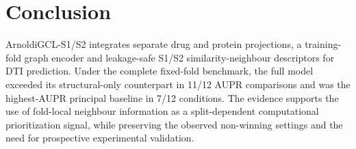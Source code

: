 \section{Conclusion}

ArnoldiGCL-S1/S2 integrates separate drug and protein projections, a training-fold graph encoder and leakage-safe S1/S2 similarity-neighbour descriptors for DTI prediction. Under the complete fixed-fold benchmark, the full model exceeded its structural-only counterpart in 11/12 AUPR comparisons and was the highest-AUPR principal baseline in 7/12 conditions. The evidence supports the use of fold-local neighbour information as a split-dependent computational prioritization signal, while preserving the observed non-winning settings and the need for prospective experimental validation.
